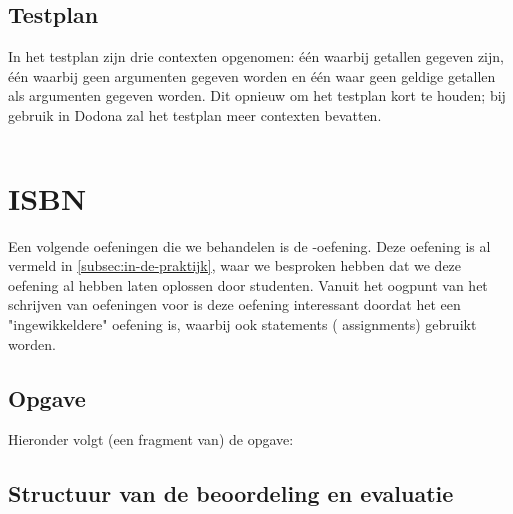 \subsection{Testplan}\label{subsec:oefening-som-testplan}

In het testplan zijn drie contexten opgenomen: één waarbij getallen gegeven zijn, één waarbij geen argumenten gegeven worden en één waar geen geldige getallen als argumenten gegeven worden.
Dit opnieuw om het testplan kort te houden;
bij gebruik in Dodona zal het testplan meer contexten bevatten.

\inputminted{json}{sources/sum-plan.tson}

\section{ISBN}\label{sec:oefening-isbn}

Een volgende oefeningen die we behandelen is de \emph{}-oefening.
Deze oefening is al vermeld in \cref{subsec:in-de-praktijk}, waar we besproken hebben dat we deze oefening al hebben laten oplossen door studenten.
Vanuit het oogpunt van het schrijven van oefeningen voor \tested{} is deze oefening interessant doordat het een "ingewikkeldere" oefening is, waarbij ook statements ( assignments) gebruikt worden.

\subsection{Opgave}\label{subsec:oefeningen-isbn-opgave}

Hieronder volgt (een fragment van) de opgave:

\begin{quote}
\end{quote}

\subsection{Structuur van de beoordeling en evaluatie}\label{subsec:oefening-isbn-structuur}

